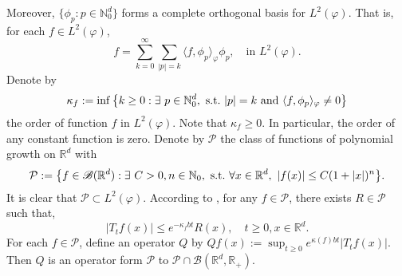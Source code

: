 \documentclass[12pt,oneside,english]{amsart}
\theoremstyle{plain}
\theoremstyle{definition}
\numberwithin{equation}{section}
\begin{document}
    Moreover, $\{\phi_p: p \in \mathbb N_0^d\}$ forms a complete orthogonal basis for $L^2(\varphi)$.
    That is, for each $f\in L^2(\varphi)$,
\begin{equation}\label{semicomp1}
    f
    =\sum_{k=0}^{\infty}\sum_{|p|=k}\langle f, \phi_p \rangle_{\varphi} \phi_p,
    \quad \text{in~} L^2(\varphi).
\end{equation}
    Denote by
\begin{equation}\label{order}
    \kappa_f
    :=\inf \left \{k\geq 0: \exists ~ p\in \mathbb N_0^d ,{\rm ~s.t.~}|p|=k {\rm ~and~}  \langle f, \phi_p \rangle_{\varphi}\neq 0\right \}
\end{equation}
    the order of function $f$ in $L^2(\varphi)$.
    Note that $ \kappa_f\geq 0$.
    In particular, the order of any constant function is zero.
{
    Denote by $\mathcal P$ the class of functions of polynomial growth on $\mathbb R^d$ with
\begin{equation}
    \mathcal{P}
    :=\big \{f\in \mathscr B(\mathbb{R}^d):\exists~ C>0, n \in \mathbb N_0, {\rm ~s.t.~} \forall x\in \mathbb{R}^d,~ |f(x)|\leq C(1+|x|)^n\big\}.
\end{equation}
    It is clear that $\mathcal{P} \subset L^2(\varphi)$.
    According to \cite[Fact 1.2]{MM}, for any $f \in \mathcal{P}$, there exists $R \in \mathcal{P}$ such that,
\begin{equation}
\label{eq:semigroupineq}
    |T_tf(x)|
    \leq e^{-\kappa_f bt} R(x),
    \quad t\geq 0, x\in \mathbb R^d.
\end{equation}
	For each $f\in \mathcal {P}$, define an operator $Q$ by $Qf(x):=\sup_{t\geq 0}e^{\kappa(f)bt} |T_tf(x)|$.
	Then $Q$ is an operator form $\mathcal P$ to $\mathcal P \cap \mathscr B
	(\mathbb R^d,\mathbb R_+)$.
}
\end{document}
